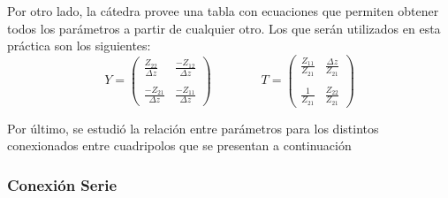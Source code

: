 \par Por otro lado, la cátedra provee una tabla con ecuaciones que permiten obtener todos los parámetros a partir de cualquier otro. Los que serán 
utilizados en esta práctica son los siguientes:
\begin{equation*}
    Y =
    \begin{pmatrix}
        \frac{Z_{22}}{\Delta z} & \frac{-Z_{12}}{\Delta z} \\ \\
        \frac{-Z_{21}}{\Delta z} & \frac{-Z_{11}}{\Delta z}
    \end{pmatrix}
    \qquad \qquad T =
    \begin{pmatrix}
        \frac{Z_{11}}{Z_{21}} & \frac{\Delta z}{Z_{21}} \\ \\
        \frac{1}{Z_{21}} & \frac{Z_{22}}{Z_{21}}
    \end{pmatrix}
\end{equation*}

\par Por último, se estudió la relación entre parámetros para los distintos conexionados entre cuadripolos que se presentan a continuación


\subsubsection*{Conexión Serie}

